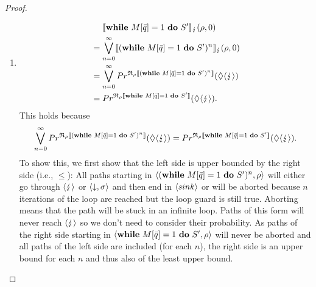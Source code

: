 \documentclass[a4paper,UKenglish,cleveref, autoref, thm-restate]{lipics-v2021}
\begin{document}
\begin{proof}
\begin{enumerate}
\begin{itemize}
\begin{enumerate}
        \item \begin{align*}
            &\phantom{=.}\llbracket \mathbf{while } \text{ }M[\Bar{q}]=1 \text{ }\mathbf{ do } \text{ }S' \rrbracket_{\lightning}(\rho,0) \\
            &= \bigvee_{n=0}^\infty \llbracket (\mathbf{while } \text{ }M[\Bar{q}]=1 \text{ }\mathbf{ do } \text{ }S')^n \rrbracket_{\lightning} (\rho,0)\\
            &= \bigvee_{n=0}^\infty Pr^{\mathfrak{R}_{\rho}\llbracket (\mathbf{while } \text{ }M[\Bar{q}]=1 \text{ }\mathbf{ do } \text{ }S')^n \rrbracket}(\lozenge \langle \lightning \rangle)\\
            &= Pr^{\mathfrak{R}_{\rho}\llbracket \mathbf{while } \text{ }M[\Bar{q}]=1 \text{ }\mathbf{ do } \text{ }S' \rrbracket}(\lozenge \langle \lightning \rangle).
        \end{align*}
        This holds because
         \begin{align*}
            \bigvee_{n=0}^\infty Pr^{\mathfrak{R}_{\rho}\llbracket (\mathbf{while } \text{ }M[\Bar{q}]=1 \text{ }\mathbf{ do } \text{ }S')^n \rrbracket}(\lozenge \langle \lightning \rangle)= Pr^{\mathfrak{R}_{\rho}\llbracket \mathbf{while } \text{ }M[\Bar{q}]=1 \text{ }\mathbf{ do } \text{ }S' \rrbracket}(\lozenge \langle \lightning \rangle).
         \end{align*}
         To show this, we first show that the left side is upper bounded by the right side (i.e., $ \leq$):
         All paths starting in $\langle (\mathbf{while } \text{ }M[\Bar{q}]=1 \text{ }\mathbf{ do } \text{ }S')^n , \rho \rangle$ will either go through $\langle \lightning \rangle$ or $\langle \downarrow , \sigma \rangle$ and then end in $\langle sink \rangle$ or will be aborted because $n$ iterations of the loop are reached but the loop guard is still true. Aborting means that the path will be stuck in an infinite loop. Paths of this form will never reach $\langle \lightning \rangle$ so we don't need to consider their probability. As paths of the right side starting in $\langle \mathbf{while } \text{ }M[\Bar{q}]=1 \text{ }\mathbf{ do } \text{ }S' , \rho \rangle$ will never be aborted and  all paths of the left side are included (for each $n$), the right side is an upper bound for each $n$ and thus also of the least upper bound.


\end{enumerate}
\end{itemize}
\end{enumerate}
\end{proof}
\end{document}
